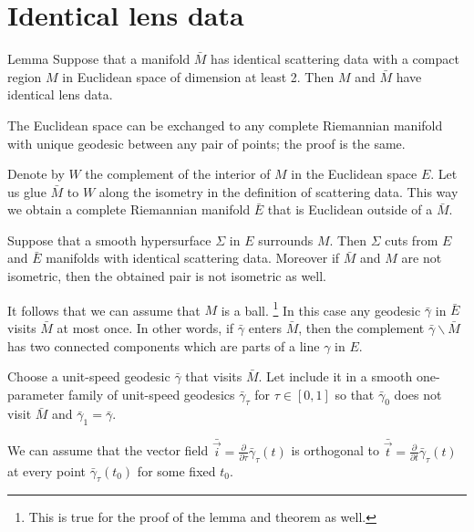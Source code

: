 \section{Identical lens data}

\begin{thm}{Lemma}\label{lem:no-delay}
Suppose that a manifold $\bar M$ has identical scattering data with a compact region $M$ in Euclidean space of dimension at least 2.
Then $M$ and $\bar M$ have identical lens data. 
\end{thm}

The Euclidean space can be exchanged to any complete Riemannian manifold with unique geodesic between any pair of points; the proof is the same.

Denote by $W$ the complement of the interior of $M$ in the Euclidean space $E$.
Let us glue $\bar M$ to $W$ along the isometry in the definition of scattering data.
This way we obtain a complete Riemannian manifold $\bar E$ that is Euclidean outside of a $\bar M$.

Suppose that a smooth hypersurface $\Sigma$ in $E$ surrounds $M$.
Then $\Sigma$ cuts from $E$ and $\bar E$ manifolds with identical scattering data.
Moreover if $\bar M$ and $M$ are not isometric,
then the obtained pair is not isometric as well.

It follows that we can assume that $M$ is a ball.%
\footnote{This is true for the proof of the lemma and theorem as well.}
In this case any geodesic $\bar\gamma$ in $\bar E$ visits $\bar M$ at most once.
In other words, if $\bar\gamma$ enters $\bar M$, then the complement $\bar\gamma\backslash \bar M$ has two connected components which are parts of a line $\gamma$ in $E$.


Choose a unit-speed geodesic $\bar\gamma$ that visits $\bar M$.
Let include it in a smooth one-parameter family of unit-speed geodesics $\bar\gamma_\tau$ for $\tau\in [0,1]$ so that $\bar\gamma_0$ does not visit $\bar M$ and $\bar \gamma_1=\bar \gamma$.

We can assume that 
the vector field $\bar{\vec i}
=\tfrac{\partial}{\partial\tau}\bar\gamma_\tau(t)$ is orthogonal to $\bar{\vec t}
=\tfrac{\partial}{\partial t}\bar\gamma_\tau(t)$ at every point $\bar\gamma_\tau(t_0)$ for some fixed $t_0$.

